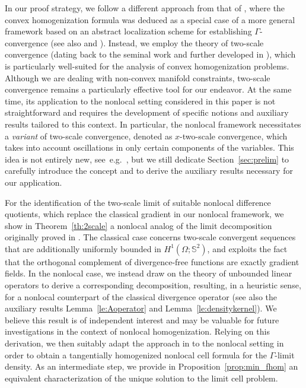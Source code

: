 \documentclass[reqno,11pt]{amsart}
\numberwithin{equation}{section}
\theoremstyle{thmlemcorr}
\numberwithin{theorem}{section}
\theoremstyle{thmlemcorr*}
\theoremstyle{defi}
\theoremstyle{remexample}
\theoremstyle{ass}
\newcommand{\1}{\mathds{1}}
\newcommand{\Om}{\Omega}
\begin{document}
 In our proof strategy, we follow a different approach from that of \cite{AAB23},  where the convex homogenization formula was deduced as a special case of a more general framework based on an abstract localization scheme for establishing \(\Gamma\)-convergence (see also \cite[Chapters~14--20]{DM93} and \cite[Sections~10--12]{BrDe98}). Instead, we employ the theory of two-scale convergence (dating back to the seminal work \cite{Ng89} and further developed in \cite{All92}),
 which is particularly well-suited for the analysis of convex homogenization problems. Although we are dealing with non-convex manifold constraints, two-scale convergence remains a particularly effective tool for our endeavor. At the same time, its application to the nonlocal setting considered in this paper is not straightforward and requires the development of specific notions and auxiliary results tailored to this context.
 In particular, the nonlocal framework necessitates a \textit{variant} of two-scale convergence, denoted as \(x\)-two-scale convergence, which takes into account oscillations in only certain components of the variables. This idea is not entirely new, see~e.g.~\cite[Section~6]{Ne10}, %
 but we still dedicate Section~\ref{sec:prelim} to carefully introduce the concept and to derive the auxiliary results necessary for our application.

 For the identification of the two-scale limit of suitable nonlocal difference quotients, which replace the classical gradient in our nonlocal framework, we show in Theorem~\ref{th:2scale} a nonlocal analog of the limit decomposition originally proved in \cite[Proposition 1.14(i)]{All92}. The classical case concerns two-scale convergent sequences that are additionally uniformly bounded in \(H^1(\Om;\mathbb{S}^2)\), and exploits the fact that the orthogonal complement of divergence-free functions are exactly gradient fields. In the nonlocal case, we instead draw on the theory of unbounded linear operators to derive a corresponding decomposition, resulting, in a heuristic sense, for a nonlocal counterpart of the classical divergence operator (see also the auxiliary results Lemma~\ref{le:Aoperator} and Lemma~\ref{le:densitykernel}).
 We believe this result is of independent interest and may be valuable for future investigations in the context of nonlocal homogenization. Relying on this derivation, we then suitably adapt the approach in \cite{DaD20} to the nonlocal setting in order to obtain a tangentially homogenized nonlocal cell formula for the \(\Gamma\)-limit density. As an intermediate step, we provide in Proposition~\ref{prop:min_fhom} an equivalent characterization of the unique solution to the limit cell problem.
    
\end{document}
